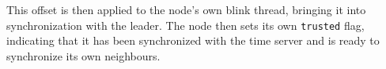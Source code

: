 \documentclass[11pt,
  a4paper,
  ngerman,
  BCOR=7mm
]{scrartcl}
\newcommand*{\ExtractCoordinate}[1]{\path (#1); \pgfgetlastxy{\XCoord}{\YCoord};}%
\begin{document}
This offset is then applied to the node's own blink thread, bringing it
into synchronization with the leader. The node then sets its own
\lstinline!trusted! flag, indicating that it has been synchronized with
the time server and is ready to synchronize its own neighbours.








\end{document}
